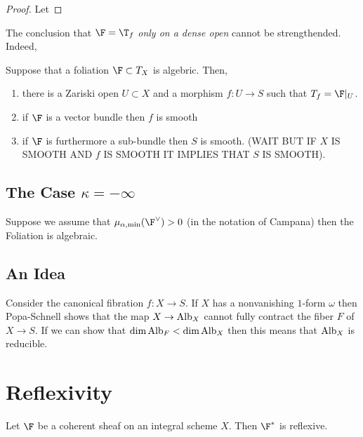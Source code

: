\documentclass[12pt]{article}
\begin{document}
\begin{proof}
Let 
\end{proof}

\begin{example}
The conclusion that $\F = \T_f$ \textit{only on a dense open} cannot be strengthended. Indeed, 
\end{example}


\begin{prop}
Suppose that a foliation $\F \subset T_X$ is algebric. Then,
\begin{enumerate}
\item there is a Zariski open $U \subset X$ and a morphism $f : U \to S$ such that $T_f = \F|_U$.
\item if $\F$ is a vector bundle then $f$ is smooth
\item if $\F$ is furthermore a sub-bundle then $S$ is  smooth. (WAIT BUT IF $X$ IS SMOOTH AND $f$ IS SMOOTH IT IMPLIES THAT $S$ IS SMOOTH). 
\end{enumerate}
\end{prop}



\subsection{The Case $\kappa = -\infty$}

Suppose we assume that $\mu_{\alpha, \text{min}}(\F^\vee) > 0$ (in the notation of Campana) then the Foliation is algebraic.







\subsection{An Idea}

Consider the canonical fibration $f : X \to S$. If $X$ has a nonvanishing $1$-form $\omega$ then Popa-Schnell shows that the map $X \to \mathrm{Alb}_X$ cannot fully contract the fiber $F$ of $X \to S$. If we can show that $\dim{\mathrm{Alb}_F} < \dim{\mathrm{Alb}_X}$ then this means that $\mathrm{Alb}_X$ is reducible. 

\section{Reflexivity}

\begin{prop}
Let $\F$ be a coherent sheaf on an integral scheme $X$. Then $\F^*$ is reflexive. 
\end{prop}
\end{document}
